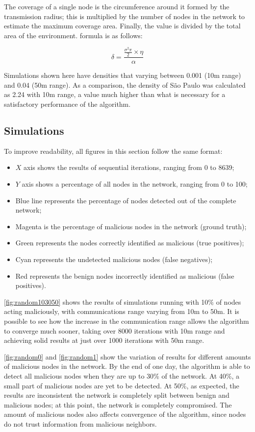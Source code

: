 \documentclass[conference]{IEEEtran}
\begin{document}
The coverage of a single node is the circumference around it formed by the transmission radius; this is multiplied by the number of nodes in the network to estimate the maximum coverage area.
Finally, the value is divided by the total area of the environment.
 formula is as follows:

$$ \delta = \frac{\frac{\sigma^2\pi}{2} \times \eta}{\alpha} $$

Simulations shown here have densities that varying between 0.001 (10m range) and 0.04 (50m range).
As a comparison, the density of São Paulo was calculated as 2.24 with 10m range, a value much higher than what is necessary for a satisfactory performance of the algorithm.

\subsection{Simulations}
\label{subsection:simulations}
To improve readability, all figures in this section follow the same format:

\begin{itemize}
\item $X$ axis shows the results of sequential iterations, ranging from 0 to 8639;
\item $Y$ axis shows a percentage of all nodes in the network, ranging from 0 to 100;
\item Blue line represents the percentage of nodes detected out of the complete network;
\item Magenta is the percentage of malicious nodes in the network (ground truth);
\item Green represents the nodes correctly identified as malicious (true positives);
\item Cyan represents the undetected malicious nodes (false negatives); 
\item Red represents the benign nodes incorrectly identified as malicious (false positives).
\end{itemize}

\autoref{fig:random103050} shows the results of simulations running with 10\% of nodes acting maliciously, with communications range varying from 10m to 50m.
It is possible to see how the increase in the communication range allows the algorithm to converge much sooner, taking over 8000 iterations with 10m range and achieving solid results at just over 1000 iterations with 50m range. 

\autoref{fig:random0} and \autoref{fig:random1} show the variation of results for different amounts of malicious nodes in the network.
By the end of one day, the algorithm is able to detect all malicious nodes when they are up to 30\% of the network.
At 40\%, a small part of malicious nodes are yet to be detected.
At 50\%, as expected, the results are inconsistent the network is completely split between benign and malicious nodes; at this point, the network is completely compromised.
The amount of malicious nodes also affects convergence of the algorithm, since nodes do not trust information from malicious neighbors.
\end{document}
